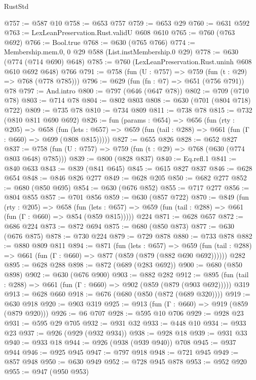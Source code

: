 \begin{lexlean}{RustStd}
\begin{coremodule}
{\begin{coremodule}
{{{{{{{{{{@757 := @587 @10
@758 := @653 @757
@759 := @653 @29
@760 := @631 @592
@763 := LexLeanPreservation.Rust.validU @608 @610
@765 := @760 (@763 @692)
@766 := Bool.true
@768 := @630 (@765 @766)
@774 := Membership.mem.{0, 0} @29 @588 (List.instMembership.{0} @29)
@778 := @630 (@774 (@714 @690) @648)
@785 := @760 (LexLeanPreservation.Rust.uninh @608 @610 @692 @648) @766
@791 := @758 (fun (U : @757) => @759 (fun (t : @29) => @768 (@778 @785)))
@796 := @629 (fun (fn : @7) => @651 (@756 @791)) @78
@797 := And.intro
@800 := @797 (@646 (@647 @78))
@802 := @709 (@710 @78)
@803 := @714 @78
@804 := @802 @803
@808 := @630 (@701 (@804 @718) @722)
@809 := @735 @78
@810 := @734 @809
@811 := @738 @78
@815 := @732 (@810 @811 @690 @692)
@826 := fun (params : @654) =>
  @656
    (fun (rty : @205) =>
    @658
      (fun (lets : @657) => @659 (fun (tail : @288) => @661 (fun (Γ : @660) => @699 (@808 @815)))))
@827 := @655 @826
@828 := @652 @827
@837 := @758 (fun (U : @757) => @759 (fun (t : @29) => @768 (@630 (@774 @803 @648) @785)))
@839 := @800 (@828 @837)
@840 := Eq.refl.{1}
@841 := @840 @633
@843 := @839 (@841 @645)
@845 := @615 @827 @837
@846 := @628 @654
@848 := @846 @826 @277
@849 := @628 @205
@850 := @682 @277
@852 := @680 (@850 @695)
@854 := @630 (@676 @852)
@855 := @717 @277
@856 := @804 @855
@857 := @701 @856
@859 := @630 (@857 @722)
@870 := @849
    (fun (rty : @205) =>
    @658
      (fun (lets : @657) => @659 (fun (tail : @288) => @661 (fun (Γ : @660) => @854 (@859 @815)))))
    @224
@871 := @628 @657
@872 := @686 @224
@873 := @872 @694
@875 := @680 (@850 @873)
@877 := @630 (@676 @875)
@878 := @730 @224
@879 := @729 @878
@880 := @733 @878
@882 := @880 @809 @811
@894 := @871
    (fun (lets : @657) =>
    @659 (fun (tail : @288) => @661 (fun (Γ : @660) => @877 (@859 (@879 (@882 @690 @692))))))
    @282
@895 := @628 @288
@898 := @872 (@689 (@283 @692))
@900 := @680 (@850 @898)
@902 := @630 (@676 @900)
@903 := @882 @282
@912 := @895 (fun (tail : @288) => @661 (fun (Γ : @660) => @902 (@859 (@879 (@903 @692))))) @319
@913 := @628 @660
@918 := @676 (@680 (@850 (@872 (@689 @320))))
@919 := @630 @918
@920 := @903 @319
@925 := @913 (fun (Γ : @660) => @919 (@859 (@879 @920)))
@926 := @6 @707
@928 := @595 @10 @706
@929 := @928 @23
@931 := @595 @29 @705
@932 := @931 @32
@933 := @448 @10
@934 := @933 @23
@937 := @926 (@929 (@932 @934))
@938 := @928 @18
@939 := @931 @33
@940 := @933 @18
@944 := @926 (@938 (@939 @940)) @708
@945 := @937 @944
@946 := @925 @945
@947 := @797 @918
@948 := @721 @945
@949 := @857 @948
@950 := @630 @949
@952 := @728 @945 @878
@953 := @952 @920
@955 := @947 (@950 @953)
}}}}}}}}}}
\end{coremodule}}
\end{coremodule}
\end{lexlean}
